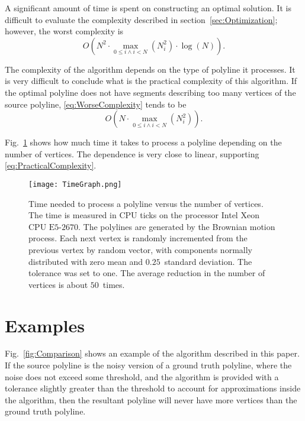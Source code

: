 \documentclass[conference]{IEEEtran}
\begin{document}
A significant amount of time is spent on constructing an optimal solution. It is difficult to evaluate the complexity described in section~\ref{sec:Optimization}; however, the worst complexity is
\begin{equation}
  O{\left( N^2 \cdot \max_{0 \leq i \wedge i < N}{\left( N_i^2 \right)} \cdot \log{\left( N \right)} \right)}
  .
  \label{eq:WorseComplexity}
\end{equation}

The complexity of the algorithm depends on the type of polyline it processes. It is very difficult to conclude what is the practical complexity of this algorithm. If the optimal polyline does not have segments describing too many vertices of the source polyline, \eqref{eq:WorseComplexity} tends to be
\begin{equation}
  O{\left( N \cdot \max_{0 \leq i \wedge i < N}{\left( N_i^2 \right)} \right)}
  .
  \label{eq:PracticalComplexity}
\end{equation}

Fig.~\ref{fig:EstimationOfAlgorithmComplexity} shows how much time it takes to process a polyline depending on the number of vertices. The dependence is very close to linear, supporting \eqref{eq:PracticalComplexity}.

\begin{figure} [htb]
  \centering
  \texttt{[image: TimeGraph.png]}
  \caption
  {
    Time needed to process a polyline versus the number of vertices. The time is measured in CPU ticks on the processor Intel Xeon CPU $\text{E5-2670}$. The polylines are generated by the Brownian motion process. Each next vertex is randomly incremented from the previous vertex by random vector, with components normally distributed with zero mean and $0.25$~standard deviation. The tolerance was set to one. The average reduction in the number of vertices is about $50$~times.
  }
  \label{fig:EstimationOfAlgorithmComplexity}
\end{figure}

\section{Examples}

Fig.~\ref{fig:Comparison} shows an example of the algorithm described in this paper. If the source polyline is the noisy version of a ground truth polyline, where the noise does not exceed some threshold, and the algorithm is provided with a tolerance slightly greater than the threshold to account for approximations inside the algorithm, then the resultant polyline will never have more vertices than the ground truth polyline.
\end{document}
